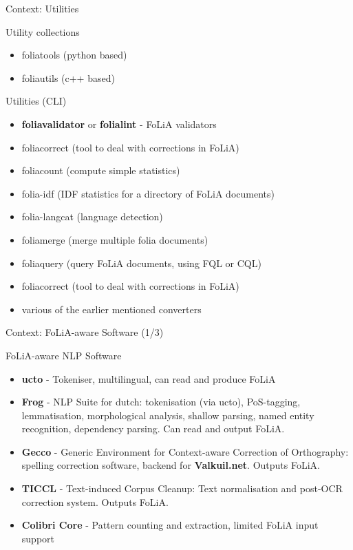 \documentclass[xcolor=table,10pt,t]{beamer}
\begin{document}
\begin{frame}{Context: Utilities}
    \begin{block}{Utility collections}
      \begin{itemize}
          \item foliatools (python based)
          \item foliautils (c++ based)
      \end{itemize}
    \end{block}
    \begin{block}{Utilities (CLI)}
      \begin{itemize}
          \item \textbf{foliavalidator} or \textbf{folialint} - FoLiA validators
          \item foliacorrect (tool to deal with corrections in FoLiA)
          \item foliacount (compute simple statistics)
          \item folia-idf (IDF statistics for a directory of FoLiA documents)
          \item folia-langcat (language detection)
          \item foliamerge (merge multiple folia documents)
          \item foliaquery (query FoLiA documents, using FQL or CQL) 
          \item foliacorrect (tool to deal with corrections in FoLiA)
          \item various of the earlier mentioned converters
      \end{itemize}
    \end{block}
\end{frame}


\begin{frame}{Context: FoLiA-aware Software (1/3)}
    \begin{block}{FoLiA-aware NLP Software}
      \begin{itemize}
        \item \textbf{ucto} - Tokeniser, multilingual, can read and produce FoLiA
        \item \textbf{Frog} - NLP Suite for dutch: tokenisation (via ucto),
            PoS-tagging, lemmatisation, morphological analysis, shallow
            parsing, named entity recognition, dependency parsing. Can read and
            output FoLiA.
        \item \textbf{Gecco} - Generic Environment for Context-aware Correction of
            Orthography: spelling correction software, backend for
            \textbf{Valkuil.net}. Outputs FoLiA.
        \item \textbf{TICCL} - Text-induced Corpus Cleanup: Text normalisation
            and post-OCR correction system. Outputs FoLiA.
        \item \textbf{Colibri Core} - Pattern counting and extraction, limited
            FoLiA input support
      \end{itemize}
    \end{block}
\end{frame}
\end{document}
